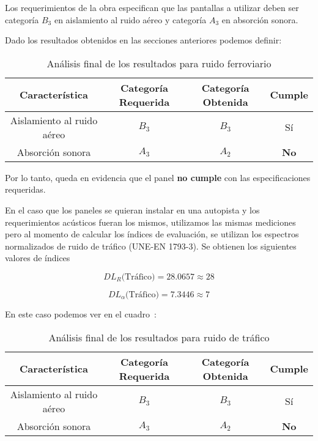 \par Los requerimientos de la obra especifican que las pantallas a utilizar deben ser categoría $B_3$ en aislamiento al ruido aéreo y categoría $A_3$ en absorción sonora.

Dado los resultados obtenidos en las secciones anteriores podemos definir:

\begin{table}[H]
\setlength\arrayrulewidth{1pt}
    \centering
    \begin{tabular}{|c|c|c|c|} \hline
        Característica & Categoría Requerida & Categoría Obtenida & Cumple \\ \hline \hline
        Aislamiento al ruido aéreo & $B_3$ & $B_3$ & Sí \\ \hline
        Absorción sonora & $A_3$ & $A_2$ & \textbf{No} \\ \hline
    \end{tabular}
    \caption{Análisis final de los resultados para ruido ferroviario}
    \label{tab:analisis_final_ferroviario}
\end{table}

\par Por lo tanto, queda en evidencia que el panel \textbf{no cumple} con las especificaciones requeridas.\\

\par En el caso que los paneles se quieran instalar en una autopista y los requerimientos acústicos fueran los mismos, utilizamos las mismas mediciones pero al momento de calcular los índices de evaluación, se utilizan los espectros normalizados de ruido de tráfico (UNE-EN 1793-3). Se obtienen los siguientes valores de índices

\begin{equation*}
    \boxed{DL_R\text{(Tráfico)} =28.0657\approx 28}
\end{equation*}

\begin{equation*}
    \boxed{DL_\alpha \text{(Tráfico)} = 7.3446\approx 7} 
\end{equation*}

\par En este caso podemos ver en el cuadro~:

\begin{table}[H]
\setlength\arrayrulewidth{1pt}
    \centering
    \begin{tabular}{|c|c|c|c|} \hline
        Característica & Categoría Requerida & Categoría Obtenida & Cumple \\ \hline \hline
        Aislamiento al ruido aéreo & $B_3$ & $B_3$ & Sí \\ \hline
        Absorción sonora & $A_3$ & $A_2$ & \textbf{No} \\ \hline
    \end{tabular}
    \caption{Análisis final de los resultados para ruido de tráfico}
    \label{tab:analisis_final_trafico}
\end{table}

